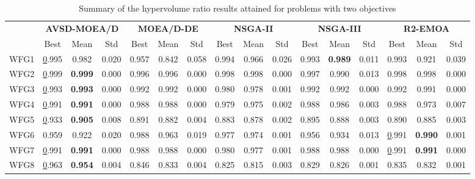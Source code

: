\begin{table*}[t]
\caption{Summary of the hypervolume ratio results attained for problems with two objectives}
\label{tab:StatisticsHV_2obj}
\centering
\begin{tabular}{c|c|c|c|c|c|c|c|c|c|c|c|c|c|c|c|}
\cline{2-16}
 & \multicolumn{3}{c|}{\textbf{AVSD-MOEA/D}} & \multicolumn{3}{c|}{\textbf{MOEA/D-DE}} & \multicolumn{3}{c|}{\textbf{NSGA-II}} & \multicolumn{3}{c|}{\textbf{NSGA-III}} & \multicolumn{3}{c|}{\textbf{R2-EMOA}} \\ \cline{2-16} 
 & Best & Mean & Std & Best & Mean & Std & Best & Mean & Std & Best & Mean & Std & Best & Mean & Std \\ \hline
\multicolumn{1}{|c|}{WFG1} & {\ul 0.995} & 0.982 & 0.020 & 0.957 & 0.842 & 0.058 & 0.994 & 0.966 & 0.026 & 0.993 & \textbf{0.989} & 0.011 & 0.993 & 0.921 & 0.039 \\ \hline
\multicolumn{1}{|c|}{WFG2} & {\ul 0.999} & \textbf{0.999} & 0.000 & 0.996 & 0.996 & 0.000 & 0.998 & 0.998 & 0.000 & 0.997 & 0.990 & 0.013 & 0.998 & 0.998 & 0.000 \\ \hline
\multicolumn{1}{|c|}{WFG3} & {\ul 0.993} & \textbf{0.993} & 0.000 & 0.992 & 0.992 & 0.000 & 0.980 & 0.978 & 0.001 & 0.992 & 0.992 & 0.000 & 0.992 & 0.991 & 0.000 \\ \hline
\multicolumn{1}{|c|}{WFG4} & {\ul 0.991} & \textbf{0.991} & 0.000 & 0.988 & 0.988 & 0.000 & 0.979 & 0.975 & 0.002 & 0.988 & 0.986 & 0.003 & 0.988 & 0.973 & 0.007 \\ \hline
\multicolumn{1}{|c|}{WFG5} & {\ul 0.933} & \textbf{0.905} & 0.008 & 0.891 & 0.882 & 0.004 & 0.883 & 0.878 & 0.002 & 0.895 & 0.888 & 0.003 & 0.890 & 0.885 & 0.003 \\ \hline
\multicolumn{1}{|c|}{WFG6} & 0.959 & 0.922 & 0.020 & 0.988 & 0.963 & 0.019 & 0.977 & 0.974 & 0.001 & 0.956 & 0.934 & 0.013 & {\ul 0.991} & \textbf{0.990} & 0.001 \\ \hline
\multicolumn{1}{|c|}{WFG7} & {\ul 0.991} & \textbf{0.991} & 0.000 & 0.988 & 0.988 & 0.000 & 0.980 & 0.977 & 0.001 & 0.988 & 0.988 & 0.000 & {\ul 0.991} & \textbf{0.991} & 0.000 \\ \hline
\multicolumn{1}{|c|}{WFG8} & {\ul 0.963} & \textbf{0.954} & 0.004 & 0.846 & 0.833 & 0.004 & 0.825 & 0.815 & 0.003 & 0.829 & 0.826 & 0.001 & 0.835 & 0.832 & 0.001 \\ \hline

\end{tabular}
\end{table*}
